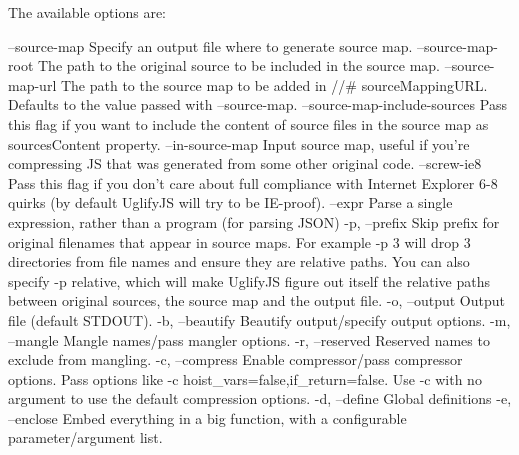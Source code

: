 The available options are\+:


\begin{DoxyCode}
--source-map                  Specify an output file where to generate source
                              map.
--source-map-root             The path to the original source to be included
                              in the source map.
--source-map-url              The path to the source map to be added in //#
                              sourceMappingURL.  Defaults to the value passed
                              with --source-map.
--source-map-include-sources  Pass this flag if you want to include the
                              content of source files in the source map as
                              sourcesContent property.
--in-source-map               Input source map, useful if you're compressing
                              JS that was generated from some other original
                              code.
--screw-ie8                   Pass this flag if you don't care about full
                              compliance with Internet Explorer 6-8 quirks
                              (by default UglifyJS will try to be IE-proof).
--expr                        Parse a single expression, rather than a
                              program (for parsing JSON)
-p, --prefix                  Skip prefix for original filenames that appear
                              in source maps. For example -p 3 will drop 3
                              directories from file names and ensure they are
                              relative paths. You can also specify -p
                              relative, which will make UglifyJS figure out
                              itself the relative paths between original
                              sources, the source map and the output file.
-o, --output                  Output file (default STDOUT).
-b, --beautify                Beautify output/specify output options.
-m, --mangle                  Mangle names/pass mangler options.
-r, --reserved                Reserved names to exclude from mangling.
-c, --compress                Enable compressor/pass compressor options. Pass
                              options like -c
                              hoist\_vars=false,if\_return=false. Use -c with
                              no argument to use the default compression
                              options.
-d, --define                  Global definitions
-e, --enclose                 Embed everything in a big function, with a
                              configurable parameter/argument list.

\end{DoxyCode}
